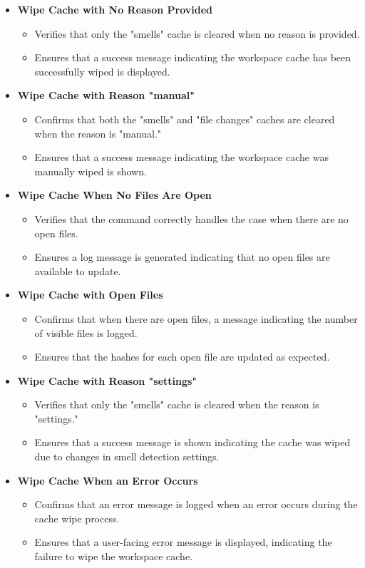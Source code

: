\documentclass[12pt, titlepage]{article}
\begin{document}
\begin{itemize}
    \item \textbf{Wipe Cache with No Reason Provided}
    \begin{itemize}
        \item Verifies that only the "smells" cache is cleared when no reason is provided.
        \item Ensures that a success message indicating the workspace cache has been successfully wiped is displayed.
    \end{itemize}

    \item \textbf{Wipe Cache with Reason "manual"}
    \begin{itemize}
        \item Confirms that both the "smells" and "file changes" caches are cleared when the reason is "manual."
        \item Ensures that a success message indicating the workspace cache was manually wiped is shown.
    \end{itemize}

    \item \textbf{Wipe Cache When No Files Are Open}
    \begin{itemize}
        \item Verifies that the command correctly handles the case when there are no open files.
        \item Ensures a log message is generated indicating that no open files are available to update.
    \end{itemize}

    \item \textbf{Wipe Cache with Open Files}
    \begin{itemize}
        \item Confirms that when there are open files, a message indicating the number of visible files is logged.
        \item Ensures that the hashes for each open file are updated as expected.
    \end{itemize}

    \item \textbf{Wipe Cache with Reason "settings"}
    \begin{itemize}
        \item Verifies that only the "smells" cache is cleared when the reason is "settings."
        \item Ensures that a success message is shown indicating the cache was wiped due to changes in smell detection settings.
    \end{itemize}

    \item \textbf{Wipe Cache When an Error Occurs}
    \begin{itemize}
        \item Confirms that an error message is logged when an error occurs during the cache wipe process.
        \item Ensures that a user-facing error message is displayed, indicating the failure to wipe the workspace cache.
    \end{itemize}
\end{itemize}
\end{document}
